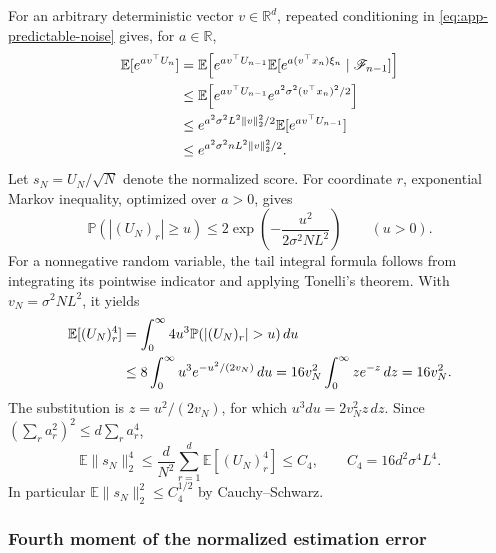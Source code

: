 \documentclass[10pt,twoside,letterpaper]{article}
\newcommand{\R}{\mathbb R}
\newcommand{\E}{\mathbb E}
\newcommand{\Prob}{\mathbb P}
\newcommand{\norm}[1]{\lVert #1\rVert}
\begin{document}
For an arbitrary deterministic vector $v\in\R^d$, repeated
conditioning in \eqref{eq:app-predictable-noise} gives, for $a\in\R$,
\begin{align}
\E[e^{a v^\top U_n}]
&=\E\!\left[e^{a v^\top U_{n-1}}
 \E[e^{a(v^\top x_n)\xi_n}\mid\mathscr F_{n-1}]\right]\notag\\
&\le\E\!\left[e^{a v^\top U_{n-1}}
 e^{a^2\sigma^2(v^\top x_n)^2/2}\right]\notag\\
&\le e^{a^2\sigma^2L^2\norm{v}_2^2/2}
 \E[e^{a v^\top U_{n-1}}]\notag\\
&\le e^{a^2\sigma^2nL^2\norm{v}_2^2/2}.
\label{eq:app-score-mgf}
\end{align}
Let $s_N=U_N/\sqrt N$ denote the normalized score. For coordinate
$r$, exponential Markov inequality, optimized over $a>0$, gives
\begin{equation}
\Prob(|(U_N)_r|\ge u)
\le2\exp\!\left(-\frac{u^2}{2\sigma^2NL^2}\right)
\qquad(u>0).
\label{eq:app-coordinate-tail}
\end{equation}
For a nonnegative random variable, the tail integral formula follows
from integrating its pointwise indicator and applying Tonelli's
theorem. With $v_N=\sigma^2NL^2$, it yields
\begin{align}
\E[(U_N)_r^4]
&=\int_0^\infty4u^3\Prob(|(U_N)_r|>u)\,du\notag\\
&\le8\int_0^\infty u^3e^{-u^2/(2v_N)}\,du
=16v_N^2\int_0^\infty z e^{-z}\,dz
=16v_N^2.
\label{eq:app-coordinate-fourth}
\end{align}
The substitution is $z=u^2/(2v_N)$, for which
$u^3du=2v_N^2z\,dz$.
Since $(\sum_ra_r^2)^2\le d\sum_ra_r^4$,
\begin{equation}
\E\norm{s_N}_2^4
\le\frac d{N^2}\sum_{r=1}^d\E[(U_N)_r^4]
\le C_4,\qquad C_4=16d^2\sigma^4L^4.
\label{eq:app-score-fourth}
\end{equation}
In particular $\E\norm{s_N}_2^2\le C_4^{1/2}$ by Cauchy--Schwarz.

\subsubsection{Fourth moment of the normalized estimation error}
\end{document}
